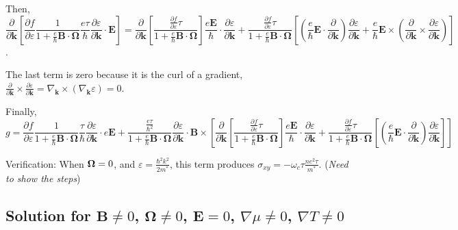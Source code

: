 \documentclass{revtex4-2}
\newcommand{\bvec}[1]{{\mathbf #1}}
\renewcommand\vec[1]{\ensuremath\boldsymbol{#1}} %
\begin{document}
Then, $$\frac{\partial}{\partial \bvec{k}} \left[ \frac{\partial f} {\partial \varepsilon}\frac{1}{1 + \frac{e}{\hbar} \bvec{B}\cdot\bvec{\Omega}}
\frac{e \tau}{\hbar} \frac{\partial \varepsilon}{\partial \bvec{k}}\cdot \bvec{E} \right] = \frac{\partial}{\partial \bvec{k}} \left[ \frac{\frac{\partial f} {\partial \varepsilon} \tau}{1 + \frac{e}{\hbar} \bvec{B}\cdot\bvec{\Omega}}
 \right] \frac{e \bvec{E}}{\hbar} \cdot \frac{\partial \varepsilon}{\partial \bvec{k}} + \frac{\frac{\partial f} {\partial \varepsilon} \tau}{1 + \frac{e}{\hbar} \bvec{B}\cdot\bvec{\Omega}} \left[(\frac{e}{\hbar} \bvec{E}\cdot \frac{\partial }{\partial \bvec{k}} )\frac{\partial \varepsilon}{\partial \bvec{k}} + \frac{e}{\hbar} \bvec{E}\times (\frac{\partial }{\partial \bvec{k}} \times \frac{\partial \varepsilon}{\partial \bvec{k}}) \right]$$.
 
 The last term is zero because it is the curl of a gradient, $\frac{\partial }{\partial \bvec{k}} \times \frac{\partial \varepsilon}{\partial \bvec{k}} = \nabla_\bvec{k} \times (\nabla_\bvec{k} \varepsilon) = 0$.
 
 Finally,
\begin{equation}\label{Eq:gnonzeroE}
 g = \frac{\partial f} {\partial \varepsilon}\frac{1}{1 + \frac{e}{\hbar} \bvec{B}\cdot\bvec{\Omega}}
 \frac{\tau}{\hbar} \frac{\partial \varepsilon}{\partial \bvec{k}}\cdot e \bvec{E} + \frac{\frac{e \tau}{\hbar^2} }{1 + \frac{e}{\hbar} \bvec{B}\cdot\bvec{\Omega}} \frac{\partial \varepsilon}{\partial \bvec{k}} \cdot \bvec{B} \times \left[ \frac{\partial}{\partial \bvec{k}} \left[ \frac{\frac{\partial f} {\partial \varepsilon} \tau}{1 + \frac{e}{\hbar} \bvec{B}\cdot\bvec{\Omega}}
 \right] \frac{e \bvec{E}}{\hbar} \cdot \frac{\partial \varepsilon}{\partial \bvec{k}} + \frac{\frac{\partial f} {\partial \varepsilon} \tau}{1 + \frac{e}{\hbar} \bvec{B}\cdot\bvec{\Omega}} \left[(\frac{e}{\hbar} \bvec{E}\cdot \frac{\partial }{\partial \bvec{k}} )\frac{\partial \varepsilon}{\partial \bvec{k}} \right] \right]
 \end{equation}
 
Verification: When $\vec{\Omega} = 0$, and $\varepsilon = \frac{\hbar^2 k^2}{2 m^*}$, this term produces $\sigma_{xy} = -\omega_c \tau \frac{n e^2 \tau}{m^*}$.
(\textit{Need to show the steps})

\subsection{Solution for $\bvec{B}\neq0$, $\bvec{\Omega}\neq 0$, $\bvec{E} = 0$, $\nabla \mu \neq 0$, $\nabla T \neq 0$}
\end{document}
